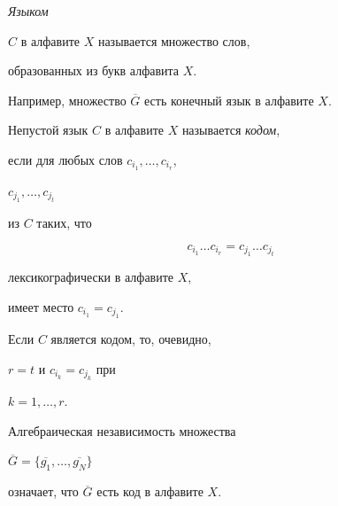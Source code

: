 \begin{defn}


{\it Языком}


$C$ в алфавите $X$ называется множество слов,


образованных из букв алфавита $X$.





Например, множество $\overline{G}$ есть конечный язык в алфавите $X$.


\end{defn}





\begin{defn}


Непустой язык $C$ в алфавите $X$ называется {\it кодом},


если для любых слов $c_{i_{1}},\dotsc, c_{i_{r}}$,


$c_{j_{1}}, \dotsc, c_{j_{t}}$


из $C$ таких, что


$$


c_{i_{1}}\dotsc c_{i_{r}}=c_{j_{1}}\dotsc c_{j_{t}}


$$


лексикографически в алфавите $X$,


имеет место $c_{i_{1}}=c_{j_{1}}$.





Если $C$ является кодом, то, очевидно,


$r=t$ и $c_{i_{k}}=c_{j_{k}}$ при 


$k=1,\dotsc, r$.


\end{defn}





Алгебраическая независимость множества


$\overline{G}=\lbrace


\overline{g_{1}}, \dotsc, \overline{g_{N}}\rbrace$


означает, что $\overline{G}$ есть код в алфавите $X$.





